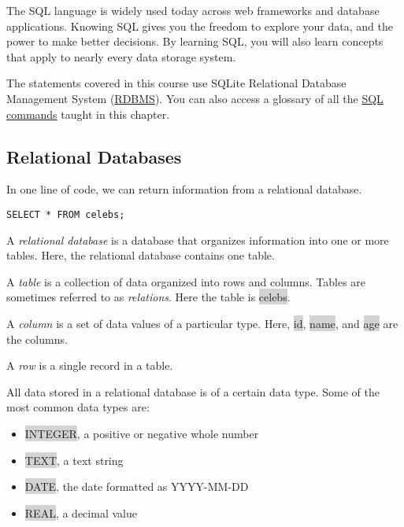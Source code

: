 \documentclass[11pt]{article}
\begin{document}
The SQL language is widely used today across web frameworks and database applications. Knowing SQL gives you the freedom to explore your data, and the power to make better decisions. By learning SQL, you will also learn concepts that apply to nearly every data storage system.

The statements covered in this course use SQLite Relational Database Management System (\href{https://www.codecademy.com/articles/what-is-rdbms-sql}{RDBMS}). You can also access a glossary of all the \href{https://www.codecademy.com/articles/sql-commands}{SQL commands} taught in this chapter.

\subsection{Relational Databases}
In one line of code, we can return information from a relational database.
\begin{lstlisting}
SELECT * FROM celebs;
\end{lstlisting}
A \textit{relational database} is a database that organizes information into one or more tables. Here, the relational database contains one table.

A \textit{table} is a collection of data organized into rows and columns. Tables are sometimes referred to as \textit{relations}. Here the table is \colorbox{lightgray}{celebs}.

A \textit{column} is a set of data values of a particular type. Here, \colorbox{lightgray}{id}, \colorbox{lightgray}{name}, and \colorbox{lightgray}{age} are the columns.

A \textit{row} is a single record in a table. 

All data stored in a relational database is of a certain data type. Some of the most common data types are:
\begin{itemize}[leftmargin = *]
\item \colorbox{lightgray}{INTEGER}, a positive or negative whole number
\item \colorbox{lightgray}{TEXT}, a text string
\item \colorbox{lightgray}{DATE}, the date formatted as YYYY-MM-DD
\item \colorbox{lightgray}{REAL}, a decimal value
\end{itemize}
\end{document}
